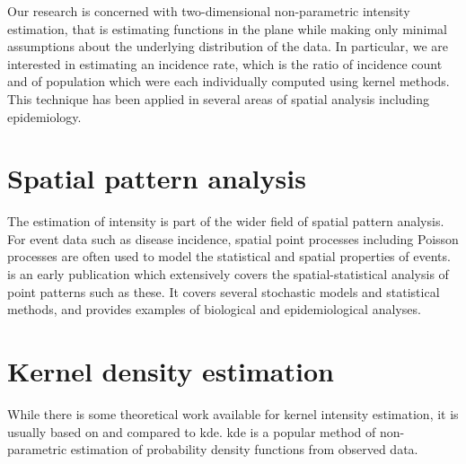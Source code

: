 

Our research is concerned with two-dimensional non-parametric intensity estimation,
that is estimating functions in the plane while making only minimal assumptions about the underlying distribution of the data. 
In particular, we are interested in estimating an incidence rate,
which is the ratio of incidence count and of population which were each individually computed using kernel methods.
This technique has been applied in several areas of spatial analysis including epidemiology.

\section{Spatial pattern analysis}

The estimation of intensity is part of the wider field of spatial pattern analysis.
For event data such as disease incidence,
spatial point processes including Poisson processes are often used to model the statistical and spatial properties of events.
 is an early publication which extensively covers the spatial-statistical analysis of point patterns such as these.
It covers several stochastic models and statistical methods,
and provides examples of biological and epidemiological analyses.

\section{Kernel density estimation}
 
While there is some theoretical work available for \gls{kernel intensity estimation},
it is usually based on and compared to \acrfull{kde}.
\Gls{kde} is a popular method of non-parametric estimation of probability density functions from observed data.

